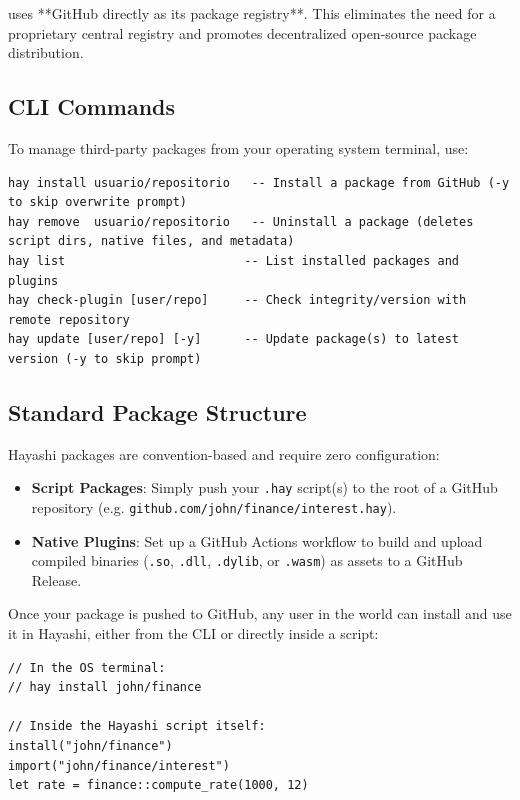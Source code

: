 \hayashi{} uses **GitHub directly as its package registry**. This eliminates the need for a proprietary central registry and promotes decentralized open-source package distribution.

\subsection{CLI Commands}
To manage third-party packages from your operating system terminal, use:

\begin{lstlisting}[style=inline, numbers=none, frame=none]
hay install usuario/repositorio   -- Install a package from GitHub (-y to skip overwrite prompt)
hay remove  usuario/repositorio   -- Uninstall a package (deletes script dirs, native files, and metadata)
hay list                         -- List installed packages and plugins
hay check-plugin [user/repo]     -- Check integrity/version with remote repository
hay update [user/repo] [-y]      -- Update package(s) to latest version (-y to skip prompt)
\end{lstlisting}

\subsection{Standard Package Structure}

Hayashi packages are convention-based and require zero configuration:
\begin{itemize}
  \item \textbf{Script Packages}: Simply push your \texttt{.hay} script(s) to the root of a GitHub repository (e.g. \texttt{github.com/john/finance/interest.hay}).
  \item \textbf{Native Plugins}: Set up a GitHub Actions workflow to build and upload compiled binaries (\texttt{.so}, \texttt{.dll}, \texttt{.dylib}, or \texttt{.wasm}) as assets to a GitHub Release.
\end{itemize}

Once your package is pushed to GitHub, any user in the world can install and use it in Hayashi, either from the CLI or directly inside a script:
\begin{lstlisting}[caption={Installing and importing a package}]
// In the OS terminal:
// hay install john/finance

// Inside the Hayashi script itself:
install("john/finance")
import("john/finance/interest")
let rate = finance::compute_rate(1000, 12)
\end{lstlisting}

